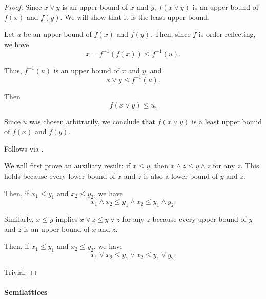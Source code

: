 \begin{proof}
   Since \( x \vee y \) is an upper bound of \( x \) and \( y \), \( f(x \vee y) \) is an upper bound of \( f(x) \) and \( f(y) \). We will show that it is the least upper bound.

  Let \( u \) be an upper bound of \( f(x) \) and \( f(y) \). Then, since \( f \) is order-reflecting, we have
  \begin{equation*}
    x = f^{-1}(f(x)) \leq f^{-1}(u).
  \end{equation*}

  Thus, \( f^{-1}(u) \) is an upper bound of \( x \) and \( y \), and
  \begin{equation*}
    x \vee y \leq f^{-1}(u).
  \end{equation*}

  Then
  \begin{equation*}
    f(x \vee y) \leq u.
  \end{equation*}

  Since \( u \) was chosen arbitrarily, we conclude that \( f(x \vee y) \) is a least upper bound of \( f(x) \) and \( f(y) \).

   Follows via .

   We will first prove an auxiliary result: if \( x \leq y \), then \( x \wedge z \leq y \wedge z \) for any \( z \). This holds because every lower bound of \( x \) and \( z \) is also a lower bound of \( y \) and \( z \).

  Then, if \( x_1 \leq y_1 \) and \( x_2 \leq y_2 \), we have
  \begin{equation*}
    x_1 \wedge x_2 \leq y_1 \wedge x_2 \leq y_1 \wedge y_2.
  \end{equation*}

  Similarly, \( x \leq y \) implies \( x \vee z \leq y \vee z \) for any \( z \) because every upper bound of \( y \) and \( z \) is an upper bound of \( x \) and \( z \).

  Then, if \( x_1 \leq y_1 \) and \( x_2 \leq y_2 \), we have
  \begin{equation*}
    x_1 \vee x_2 \leq y_1 \vee x_2 \leq y_1 \vee y_2.
  \end{equation*}

   Trivial.
\end{proof}

\paragraph{Semilattices}

